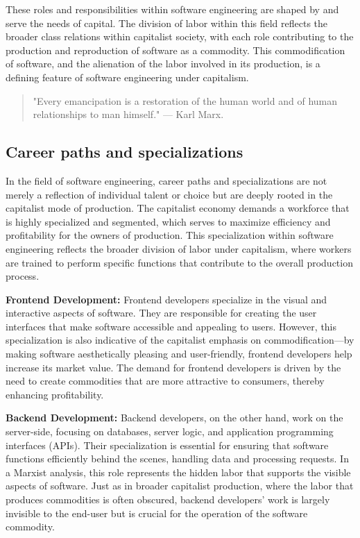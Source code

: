 \begin{refsection}
\begin{multicols}{2}
{These roles and responsibilities within software engineering are shaped by and serve the needs of capital. The division of labor within this field reflects the broader class relations within capitalist society, with each role contributing to the production and reproduction of software as a commodity. This commodification of software, and the alienation of the labor involved in its production, is a defining feature of software engineering under capitalism.

\begin{quote}
"Every emancipation is a restoration of the human world and of human relationships to man himself." — Karl Marx\cite{marx1844}.
\end{quote}
}
\subsection{Career paths and specializations}
{\small
In the field of software engineering, career paths and specializations are not merely a reflection of individual talent or choice but are deeply rooted in the capitalist mode of production. The capitalist economy demands a workforce that is highly specialized and segmented, which serves to maximize efficiency and profitability for the owners of production. This specialization within software engineering reflects the broader division of labor under capitalism, where workers are trained to perform specific functions that contribute to the overall production process.

\textbf{Frontend Development:} Frontend developers specialize in the visual and interactive aspects of software. They are responsible for creating the user interfaces that make software accessible and appealing to users. However, this specialization is also indicative of the capitalist emphasis on commodification—by making software aesthetically pleasing and user-friendly, frontend developers help increase its market value. The demand for frontend developers is driven by the need to create commodities that are more attractive to consumers, thereby enhancing profitability.

\textbf{Backend Development:} Backend developers, on the other hand, work on the server-side, focusing on databases, server logic, and application programming interfaces (APIs). Their specialization is essential for ensuring that software functions efficiently behind the scenes, handling data and processing requests. In a Marxist analysis, this role represents the hidden labor that supports the visible aspects of software. Just as in broader capitalist production, where the labor that produces commodities is often obscured, backend developers' work is largely invisible to the end-user but is crucial for the operation of the software commodity.

}
\end{multicols}
\end{refsection}
